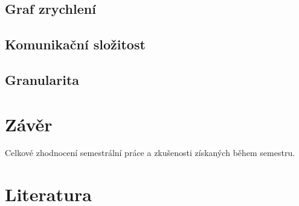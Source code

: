 \documentclass[11pt]{article}
\begin{document}
\subsection{Graf zrychlení}
\subsection{Komunikační složitost}
\subsection{Granularita}


\section{Závěr}

Celkové zhodnocení semestrální práce a zkušenosti získaných během
semestru.

\section{Literatura}

\appendix
\end{document}
